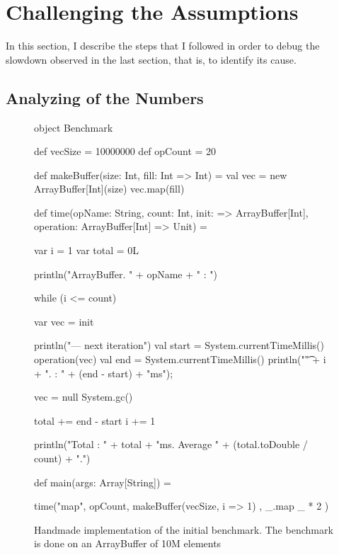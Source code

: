 
\section{Challenging the Assumptions}

In this section, I describe the steps that I followed in order to debug the slowdown observed in the last section, that is, to identify its cause.

\subsection{Analyzing of the Numbers}

\begin{figure}
\begin{lstlisting-nobreak}
object Benchmark {

  def vecSize = 10000000
  def opCount = 20

  def makeBuffer(size: Int, fill: Int => Int) = {
    val vec = new ArrayBuffer[Int](size)
    vec.map(fill)
  }

  def time(opName: String, count: Int, init: => ArrayBuffer[Int], operation: ArrayBuffer[Int] => Unit) = {
    var i = 1
    var total = 0L

    println("ArrayBuffer. " + opName + " : ")

    while (i <= count) {
      var vec = init

      println("--- next iteration")
      val start = System.currentTimeMillis()
      operation(vec)
      val end = System.currentTimeMillis()
      println("\t" + i + ". : " + (end - start) + "ms");

      vec = null
      System.gc()

      total += end - start
      i += 1
    }

    println("Total : " + total + "ms. Average " + (total.toDouble / count) + ".\n")
  }

  def main(args: Array[String]) = {

    time("map", opCount, {
      makeBuffer(vecSize, i => 1)
    }, {
      _.map { _ * 2 }
    })

  }
}
\end{lstlisting-nobreak}
\caption{Handmade implementation of the initial benchmark. The benchmark is done on an ArrayBuffer of 10M elements}
\label{fig:HandMadeBench}
\end{figure}


